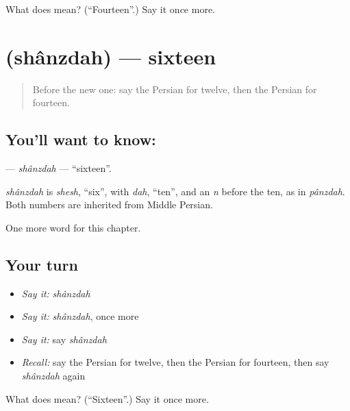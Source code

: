 \begin{tcolorbox}[breakable,colback=teal!4,colframe=teal!35!black,title={Before you move on}]
What does  mean? (\textquotedblleft{}Fourteen\textquotedblright{}.) Say it once more.
\end{tcolorbox}
\section[\texorpdfstring{\fa{شانزده} (shânzdah)}{شانزده (shânzdah)}]{ (shânzdah) — sixteen}

\label{lesson:FA-C75-shanzdah}



\begin{quote}
Before the new one: say the Persian for twelve, then the Persian for fourteen.
\end{quote}

\subsection*{You'll want to know: }
\textbf{} — \emph{shânzdah} — \textquotedblleft{}sixteen\textquotedblright{}.

\begin{cousinweb}
\emph{shânzdah} is \emph{shesh}, \textquotedblleft{}six\textquotedblright{}, with \emph{dah}, \textquotedblleft{}ten\textquotedblright{}, and an \emph{n} before the ten, as in \emph{pânzdah}. Both numbers are inherited from Middle Persian.
\end{cousinweb}

\begin{grammarlens}[title={What you've built}]
One more word for this chapter.
\end{grammarlens}

\subsection*{Your turn}
\begin{itemize}
\raggedright
  \item \emph{Say it:} \emph{shânzdah}
  \item \emph{Say it:} \emph{shânzdah}, once more
  \item \emph{Say it:} say \emph{shânzdah}
  \item \emph{Recall:} say the Persian for twelve, then the Persian for fourteen, then say \emph{shânzdah} again
\end{itemize}

\begin{tcolorbox}[breakable,colback=teal!4,colframe=teal!35!black,title={Before you move on}]
What does  mean? (\textquotedblleft{}Sixteen\textquotedblright{}.) Say it once more.
\end{tcolorbox}
